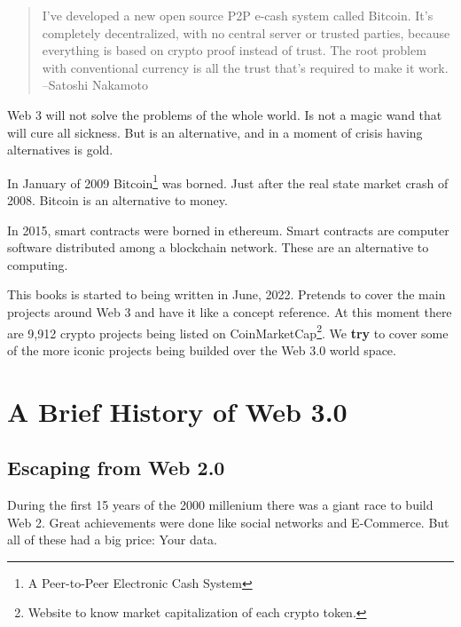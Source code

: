\documentclass[oneside,11pt]{memoir} %
\begin{document}
\begin{quote}
I've developed a new open source P2P e-cash system called Bitcoin. It's completely decentralized, with no central server or trusted parties, because everything is based on crypto proof instead of trust. The root problem with conventional currency is all the trust that's required to make it work.\\
--Satoshi Nakamoto
\end{quote}

Web 3 will not solve the problems of the whole world. Is not a magic wand that will cure all sickness. But is an alternative, and in a moment of crisis having alternatives is gold.

In January of 2009 Bitcoin\footnote{A Peer-to-Peer Electronic Cash System} was borned. Just after the real state market crash of 2008. Bitcoin is an alternative to money.

In 2015, smart contracts were borned in ethereum. Smart contracts are computer software distributed among a blockchain network. These are an alternative to computing.

This books is started to being written in June, 2022. Pretends to cover the main projects around Web 3 and have it like a concept reference. At this moment there are 9,912 crypto projects being listed on CoinMarketCap\footnote{Website to know market capitalization of each crypto token.}. We \textbf{try} to cover some of the more iconic projects being builded over the Web 3.0 world space.

\part{A Brief History of Web 3.0}
\restoregeometry


\chapter{Escaping from Web 2.0}

During the first 15 years of the 2000 millenium there was a giant race to build Web 2. Great achievements were done like social networks and E-Commerce. But all of these had a big price: Your data.
\end{document}
